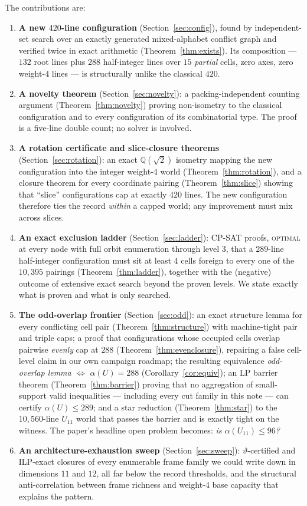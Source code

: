 \documentclass[11pt]{article}
\theoremstyle{remark}
\newcommand{\QQ}{\mathbb{Q}}
\begin{document}
The contributions are:
\begin{enumerate}
\item \textbf{A new $420$-line configuration} (Section~\ref{sec:config}),
found by independent-set search over an exactly generated mixed-alphabet
conflict graph and verified twice in exact arithmetic
(Theorem~\ref{thm:exists}). Its composition --- $132$ root lines plus
$288$ half-integer lines over $15$ \emph{partial} cells, zero axes, zero
weight-$4$ lines --- is structurally unlike the classical $420$.
\item \textbf{A novelty theorem} (Section~\ref{sec:novelty}): a
packing-independent counting argument (Theorem~\ref{thm:novelty}) proving
non-isometry to the classical configuration and to every configuration of
its combinatorial type. The proof is a five-line double count; no solver
is involved.
\item \textbf{A rotation certificate and slice-closure theorems}
(Section~\ref{sec:rotation}): an exact $\QQ(\sqrt2)$ isometry mapping the
new configuration into the integer weight-$4$ world
(Theorem~\ref{thm:rotation}), and a closure theorem for every coordinate
pairing (Theorem~\ref{thm:slice}) showing that ``slice'' configurations cap
at exactly $420$ lines. The new configuration therefore ties the record
\emph{within} a capped world; any improvement must mix across slices.
\item \textbf{An exact exclusion ladder} (Section~\ref{sec:ladder}):
CP-SAT proofs, \textsc{optimal} at every node with full orbit enumeration
through level $3$, that a $289$-line half-integer configuration must sit at
least $4$ cells foreign to every one of the $10{,}395$ pairings
(Theorem~\ref{thm:ladder}), together with the (negative) outcome of
extensive exact search beyond the proven levels. We state exactly what is
proven and what is only searched.
\item \textbf{The odd-overlap frontier} (Section~\ref{sec:odd}): an exact
structure lemma for every conflicting cell pair
(Theorem~\ref{thm:structure}) with machine-tight pair and triple caps; a
proof that configurations whose occupied cells overlap pairwise
\emph{evenly} cap at $288$ (Theorem~\ref{thm:evenclosure}), repairing a
false cell-level claim in our own campaign roadmap; the resulting
equivalence \emph{odd-overlap lemma $\Leftrightarrow$ $\alpha(U)=288$}
(Corollary~\ref{cor:equiv}); an LP barrier theorem
(Theorem~\ref{thm:barrier}) proving that no aggregation of small-support
valid inequalities --- including every cut family in this note --- can
certify $\alpha(U)\le 289$; and a star reduction
(Theorem~\ref{thm:star}) to the $10{,}560$-line $U_{11}$ world that passes
the barrier and is exactly tight on the witness. The paper's headline open
problem becomes: \emph{is $\alpha(U_{11})\le 96$?}
\item \textbf{An architecture-exhaustion sweep} (Section~\ref{sec:sweep}):
$\vartheta$-certified and ILP-exact closures of every enumerable frame
family we could write down in dimensions $11$ and $12$, all far below the
record thresholds, and the structural anti-correlation between frame
richness and weight-$4$ base capacity that explains the pattern.
\end{enumerate}
\end{document}
